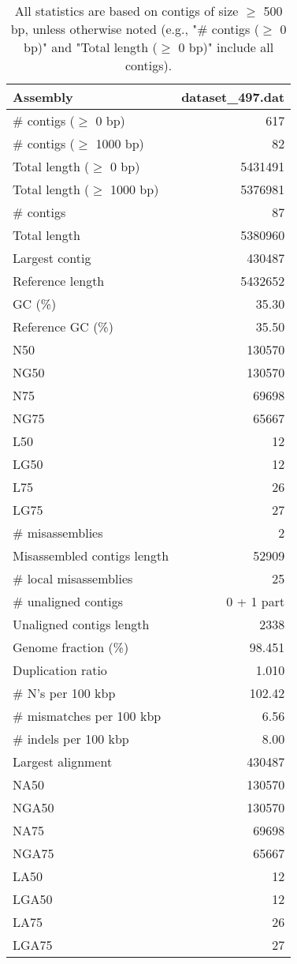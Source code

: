 \documentclass[12pt,a4paper]{article}
\begin{document}
\begin{table}[ht]
\begin{center}
\caption{All statistics are based on contigs of size $\geq$ 500 bp, unless otherwise noted (e.g., "\# contigs ($\geq$ 0 bp)" and "Total length ($\geq$ 0 bp)" include all contigs).}
\begin{tabular}{|l*{1}{|r}|}
\hline
Assembly & dataset\_497.dat \\ \hline
\# contigs ($\geq$ 0 bp) & 617 \\ \hline
\# contigs ($\geq$ 1000 bp) & 82 \\ \hline
Total length ($\geq$ 0 bp) & 5431491 \\ \hline
Total length ($\geq$ 1000 bp) & 5376981 \\ \hline
\# contigs & 87 \\ \hline
Total length & 5380960 \\ \hline
Largest contig & 430487 \\ \hline
Reference length & 5432652 \\ \hline
GC (\%) & 35.30 \\ \hline
Reference GC (\%) & 35.50 \\ \hline
N50 & 130570 \\ \hline
NG50 & 130570 \\ \hline
N75 & 69698 \\ \hline
NG75 & 65667 \\ \hline
L50 & 12 \\ \hline
LG50 & 12 \\ \hline
L75 & 26 \\ \hline
LG75 & 27 \\ \hline
\# misassemblies & 2 \\ \hline
Misassembled contigs length & 52909 \\ \hline
\# local misassemblies & 25 \\ \hline
\# unaligned contigs & 0 + 1 part \\ \hline
Unaligned contigs length & 2338 \\ \hline
Genome fraction (\%) & 98.451 \\ \hline
Duplication ratio & 1.010 \\ \hline
\# N's per 100 kbp & 102.42 \\ \hline
\# mismatches per 100 kbp & 6.56 \\ \hline
\# indels per 100 kbp & 8.00 \\ \hline
Largest alignment & 430487 \\ \hline
NA50 & 130570 \\ \hline
NGA50 & 130570 \\ \hline
NA75 & 69698 \\ \hline
NGA75 & 65667 \\ \hline
LA50 & 12 \\ \hline
LGA50 & 12 \\ \hline
LA75 & 26 \\ \hline
LGA75 & 27 \\ \hline
\end{tabular}
\end{center}
\end{table}
\end{document}
